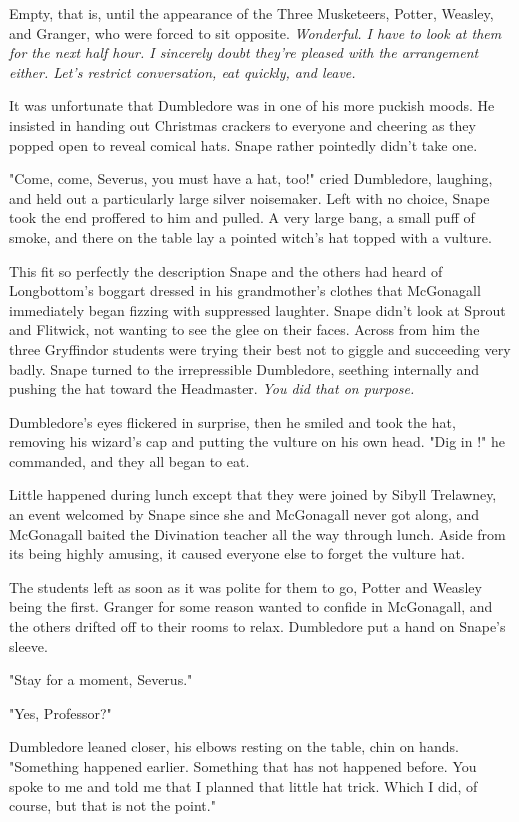 Empty, that is, until the appearance of the Three Musketeers, Potter, Weasley, and Granger, who were forced to sit opposite. \emph{Wonderful. I have to look at them for the next half hour. I sincerely doubt they're pleased with the arrangement either. Let's restrict conversation, eat quickly, and leave.}

It was unfortunate that Dumbledore was in one of his more puckish moods. He insisted in handing out Christmas crackers to everyone and cheering as they popped open to reveal comical hats. Snape rather pointedly didn't take one.

"Come, come, Severus, you must have a hat, too!" cried Dumbledore, laughing, and held out a particularly large silver noisemaker. Left with no choice, Snape took the end proffered to him and pulled. A very large bang, a small puff of smoke, and there on the table lay a pointed witch's hat topped with a vulture.

This fit so perfectly the description Snape and the others had heard of Longbottom's boggart dressed in his grandmother's clothes that McGonagall immediately began fizzing with suppressed laughter. Snape didn't look at Sprout and Flitwick, not wanting to see the glee on their faces. Across from him the three Gryffindor students were trying their best not to giggle and succeeding very badly. Snape turned to the irrepressible Dumbledore, seething internally and pushing the hat toward the Headmaster. \emph{You did that on purpose.}

Dumbledore's eyes flickered in surprise, then he smiled and took the hat, removing his wizard's cap and putting the vulture on his own head. "Dig in !" he commanded, and they all began to eat.

Little happened during lunch except that they were joined by Sibyll Trelawney, an event welcomed by Snape since she and McGonagall never got along, and McGonagall baited the Divination teacher all the way through lunch. Aside from its being highly amusing, it caused everyone else to forget the vulture hat.

The students left as soon as it was polite for them to go, Potter and Weasley being the first. Granger for some reason wanted to confide in McGonagall, and the others drifted off to their rooms to relax. Dumbledore put a hand on Snape's sleeve.

"Stay for a moment, Severus."

"Yes, Professor?"

Dumbledore leaned closer, his elbows resting on the table, chin on hands. "Something happened earlier. Something that has not happened before. You spoke to me and told me that I planned that little hat trick. Which I did, of course, but that is not the point."

